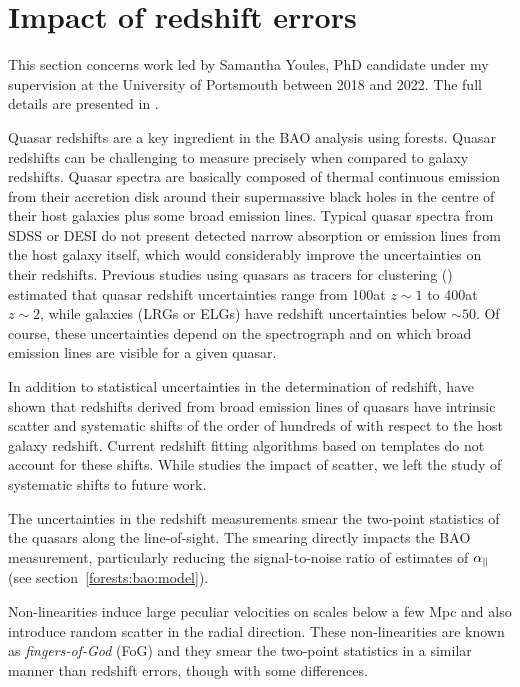 \section{Impact of redshift errors}
\label{forests:zerrors}

This section concerns work led by Samantha Youles, PhD candidate under 
my supervision at the University of Portsmouth between 2018 and 2022. 
The full details are presented in \cite{youlesEffectQuasarRedshift2022a}. 

Quasar redshifts are a key ingredient in the BAO analysis using forests. 
Quasar redshifts can be challenging to measure precisely when compared to galaxy redshifts. 
Quasar spectra are basically composed of thermal continuous emission 
from their accretion disk around their supermassive
black holes in the centre of their host galaxies plus some broad emission lines. 
Typical quasar spectra from SDSS or DESI do not present detected narrow absorption or 
emission lines from the host galaxy itself, which would considerably improve the 
uncertainties on their redshifts. Previous studies using quasars as tracers for 
clustering (\cite{zarroukClusteringSDSSIVExtended2018, lykeSloanDigitalSky2020}) 
estimated that quasar redshift uncertainties range from 
100\kms at $z\sim 1$ to 400\kms at $z\sim 2$, while galaxies (LRGs or ELGs) have 
redshift uncertainties below $\sim 50$\kms. Of course, these uncertainties 
depend on the spectrograph and on which broad emission lines are visible
for a given quasar. 

In addition to statistical uncertainties in the determination of redshift, 
\cite{shenSloanDigitalSky2016} have shown that redshifts derived from 
broad emission lines of quasars have intrinsic scatter and systematic shifts
of the order of hundreds of \kms with respect to the host galaxy redshift. 
Current redshift fitting algorithms based on templates do not account for these shifts. 
While \cite{youlesEffectQuasarRedshift2022a} studies the impact of scatter, 
we left the study of systematic shifts to future work. 


The uncertainties in the redshift measurements smear the two-point statistics 
of the quasars  along the line-of-sight. The smearing directly 
impacts the BAO measurement, particularly reducing the signal-to-noise ratio 
of estimates of ${\alpha_\parallel}$ (see section~\ref{forests:bao:model}). 

Non-linearities induce large peculiar velocities on scales below a few Mpc
and also introduce random scatter in the radial direction.
These non-linearities are known as \emph{fingers-of-God} (FoG) and they smear
the two-point statistics in a similar manner than redshift errors, though 
with some differences. 

